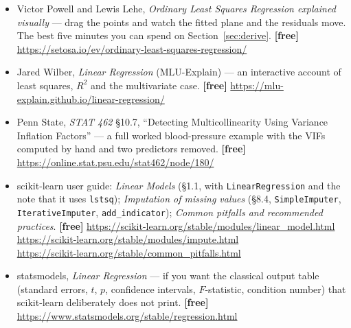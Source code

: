 \documentclass[11pt]{article}
\begin{document}
\begin{itemize}[leftmargin=*]
  \item Victor Powell and Lewis Lehe, \emph{Ordinary Least Squares Regression
    explained visually} --- drag the points and watch the fitted plane and
    the residuals move. The best five minutes you can spend on
    Section~\ref{sec:derive}. \textbf{[free]}
    \url{https://setosa.io/ev/ordinary-least-squares-regression/}
  \item Jared Wilber, \emph{Linear Regression} (MLU-Explain) --- an
    interactive account of least squares, $R^2$ and the multivariate case.
    \textbf{[free]} \url{https://mlu-explain.github.io/linear-regression/}
  \item Penn State, \emph{STAT 462} \S10.7, ``Detecting Multicollinearity
    Using Variance Inflation Factors'' --- a full worked blood-pressure
    example with the VIFs computed by hand and two predictors removed.
    \textbf{[free]} \url{https://online.stat.psu.edu/stat462/node/180/}
  \item scikit-learn user guide: \emph{Linear Models} (\S1.1, with
    \texttt{LinearRegression} and the note that it uses \texttt{lstsq});
    \emph{Imputation of missing values} (\S8.4, \texttt{SimpleImputer},
    \texttt{IterativeImputer}, \texttt{add\_indicator}); \emph{Common
    pitfalls and recommended practices}. \textbf{[free]}
    \url{https://scikit-learn.org/stable/modules/linear_model.html} \\
    \url{https://scikit-learn.org/stable/modules/impute.html} \\
    \url{https://scikit-learn.org/stable/common_pitfalls.html}
  \item statsmodels, \emph{Linear Regression} --- if you want the classical
    output table (standard errors, $t$, $p$, confidence intervals,
    $F$-statistic, condition number) that scikit-learn deliberately does not
    print. \textbf{[free]}
    \url{https://www.statsmodels.org/stable/regression.html}
\end{itemize}

\enlargethispage{4\baselineskip}
\notesources{\AMLUnitVSources}
\end{document}
